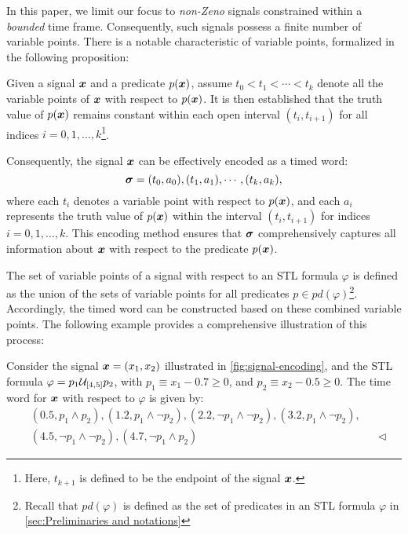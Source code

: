         
        
        In this paper, we limit our focus to \emph{non-Zeno} signals constrained within a \emph{bounded} time frame. Consequently, such signals possess a finite number of variable points. There is a notable characteristic of variable points, formalized in the following proposition:
        \begin{proposition}
            Given a signal $\bm{x}$ and a predicate $p(\bm{x})$, assume $t_0 < t_1 < \cdots < t_k$ denote all the variable points of $\bm{x}$ with respect to $p(\bm{x})$. It is then established that the truth value of $p(\bm{x})$ remains constant within each open interval $(t_i, t_{i+1})$ for all indices $i = 0, 1, \ldots, k$\footnote{Here, $t_{k+1}$ is defined to be the endpoint of the signal $\bm{x}$.}.
        \end{proposition}

        Consequently, the signal $\bm{x}$ can be effectively encoded as a timed word:
        \[
            \bm{\sigma} = (t_0, a_0), (t_1, a_1), \cdots, (t_k, a_k),
        \]
        where each $t_i$ denotes a variable point with respect to $p(\bm{x})$, and each $a_i$ represents the truth value of $p(\bm{x})$ within the interval $(t_i, t_{i+1})$ for indices $i = 0, 1, \ldots, k$. This encoding method ensures that $\bm{\sigma}$ comprehensively captures all information about $\bm{x}$ with respect to the predicate $p(\bm{x})$. 

        The set of variable points of a signal with respect to an STL formula $\varphi$ is defined as the union of the sets of variable points for all predicates $p\in pd(\varphi)$\footnote{Recall that $pd(\varphi)$ is defined as the set of predicates in an STL formula $\varphi$ in \cref{sec:Preliminaries and notations}}. Accordingly, the timed word can be constructed based on these combined variable points. 
        The following example provides a comprehensive illustration of this process:

        \begin{example}\label{exp:variable-point}
            Consider the signal $\bm{x}=(x_1, x_2)$ illustrated in \cref{fig:signal-encoding}, and the STL formula $\varphi = p_1 \until_{[4,5]} p_2$, with $p_1 \equiv x_1 - 0.7 \ge 0$, and $p_2 \equiv x_2 - 0.5\ge 0$. The time word for $\bm{x}$ with respect to $\varphi$ is given by:
            \begin{align*}
            &(0.5,p_1\land p_2),(1.2, p_1 \land \neg p_2),(2.2, \neg p_1\land \neg p_2),(3.2, p_1\land \neg p_2),&&\\
            &(4.5,\neg p_1\land \neg p_2), (4.7, \neg p_1 \land p_2)%
            &&\lhd
            \end{align*}
        \end{example}
        
